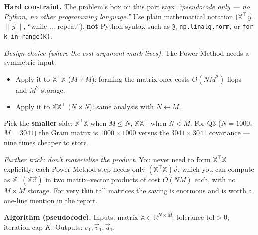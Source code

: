 \documentclass[12pt,a4paper]{article}
\begin{document}
\begin{warn}
\textbf{Hard constraint.} The problem's box on this part says: \emph{``pseudocode only --- no Python, no other programming language.''} Use plain mathematical notation ($\mathbb{X}^\top\vec y$, $\lVert\vec y\rVert$, ``while $\dots$ repeat''), \textbf{not} Python syntax such as \texttt{@}, \texttt{np.\allowbreak linalg.\allowbreak norm}, or \texttt{for k \allowbreak in \allowbreak range(K)}.
\end{warn}

\emph{Design choice (where the cost-argument mark lives).} The Power Method needs a symmetric input.
\begin{itemize}[leftmargin=*]
\item Apply it to $\mathbb{X}^\top\mathbb{X}$ ($M\times M$): forming the matrix once costs $O(NM^2)$ flops and $M^2$ storage.
\item Apply it to $\mathbb{X}\mathbb{X}^\top$ ($N\times N$): same analysis with $N\leftrightarrow M$.
\end{itemize}
Pick the \textbf{smaller} side: $\mathbb{X}^\top\mathbb{X}$ when $M \le N$, $\mathbb{X}\mathbb{X}^\top$ when $N < M$. For Q3 ($N=1000$, $M=3041$) the Gram matrix is $1000\times 1000$ versus the $3041\times 3041$ covariance --- nine times cheaper to store.

\emph{Further trick: don't materialise the product.} You never need to form $\mathbb{X}^\top\mathbb{X}$ explicitly: each Power-Method step needs only $(\mathbb{X}^\top\mathbb{X})\vec v$, which you can compute as $\mathbb{X}^\top(\mathbb{X}\vec v)$ in two matrix--vector products of cost $O(NM)$ each, with no $M\times M$ storage. For very thin tall matrices the saving is enormous and is worth a one-line mention in the report.

\medskip
\noindent\textbf{Algorithm (pseudocode).} Inputs: matrix $\mathbb{X}\in\mathbb{R}^{N\times M}$; tolerance $\mathrm{tol}>0$; iteration cap $K$. Outputs: $\sigma_1, \vec v_1, \vec u_1$.
\end{document}
